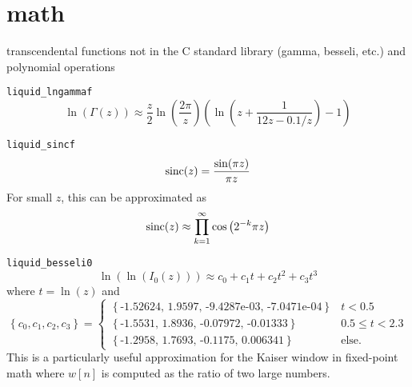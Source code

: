 % 
%

\section{math}
\label{module:math}
transcendental functions not in the C standard library (gamma, besseli, etc.)
and polynomial operations

{\tt liquid\_lngammaf}
\[
    \ln(\Gamma(z)) \approx
    \frac{z}{2} \ln\left( \frac{2\pi}{z} \right)
    \left(
        \ln\left(z + \frac{1}{12 z - 0.1/z} \right) - 1
    \right)
\]

{\tt liquid\_sincf}
\[ \textup{sinc}(z) = \frac{\sin(\pi z)}{\pi z} \]
For small $z$, this can be approximated as
\[
    \textup{sinc}(z) \approx \prod_{k=1}^{\infty}{ \cos\left( 2^{-k} \pi z \right) }
\]

{\tt liquid\_besseli0}
\[
    \ln\left(\ln\left(I_0(z)\right)\right) \approx
    c_0 + c_1 t + c_2 t ^2 + c_3 t^3
\]
where $t=\ln(z)$ and
\[
    \left\{c_0,c_1,c_2,c_3\right\} =
    \begin{cases}
    \left\{\text{-1.52624, 1.9597, -9.4287e-03, -7.0471e-04}\right\} & t < 0.5 \\
    \left\{\text{-1.5531, 1.8936, -0.07972, -0.01333}\right\} & 0.5 \le t < 2.3 \\
    \left\{\text{-1.2958, 1.7693, -0.1175, 0.006341}\right\} & \text{else}.
    \end{cases}
\]
This is a particularly useful approximation for the Kaiser window in
fixed-point math where $w[n]$ is computed as the ratio of two large numbers.

